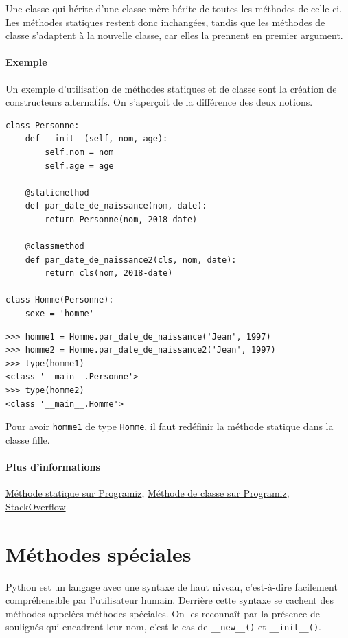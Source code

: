 \documentclass[a4paper, 10pt]{article}
\begin{document}
Une classe qui hérite d'une classe mère hérite de toutes les méthodes de celle-ci. Les méthodes statiques restent donc inchangées, tandis que les méthodes de classe s'adaptent à la nouvelle classe, car elles la prennent en premier argument.

\paragraph{Exemple} Un exemple d'utilisation de méthodes statiques et de classe sont la création de constructeurs alternatifs. On s'aperçoit de la différence des deux notions.
\begin{verbatim}
class Personne:
    def __init__(self, nom, age):
        self.nom = nom
        self.age = age

    @staticmethod
    def par_date_de_naissance(nom, date):
        return Personne(nom, 2018-date)

    @classmethod
    def par_date_de_naissance2(cls, nom, date):
        return cls(nom, 2018-date)

class Homme(Personne):
    sexe = 'homme'
\end{verbatim}
\begin{verbatim}
>>> homme1 = Homme.par_date_de_naissance('Jean', 1997)
>>> homme2 = Homme.par_date_de_naissance2('Jean', 1997)
>>> type(homme1)
<class '__main__.Personne'>
>>> type(homme2)
<class '__main__.Homme'>
\end{verbatim}

Pour avoir \texttt{homme1} de type \texttt{Homme}, il faut redéfinir la méthode statique dans la classe fille.

\paragraph{Plus d'informations} \href{https://www.programiz.com/python-programming/methods/built-in/staticmethod}{Méthode statique sur Programiz}, \href{https://www.programiz.com/python-programming/methods/built-in/classmethod}{Méthode de classe sur Programiz}, \href{https://stackoverflow.com/questions/136097/what-is-the-difference-between-staticmethod-and-classmethod-in-python/1669524#1669524}{StackOverflow}



\section{Méthodes spéciales}
Python est un langage avec une syntaxe de haut niveau, c'est-à-dire facilement compréhensible par l'utilisateur humain. Derrière cette syntaxe se cachent des méthodes appelées méthodes spéciales. On les reconnaît par la présence de soulignés qui encadrent leur nom, c'est le cas de \texttt{__new__()} et \texttt{__init__()}.
\end{document}
